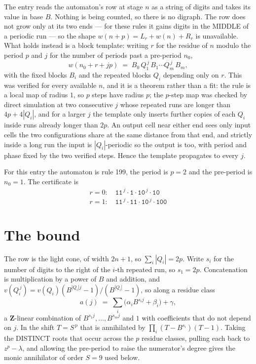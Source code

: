 \documentclass[11pt,a4paper]{article}
\theoremstyle{plain}
\theoremstyle{definition}
\begin{document}
The entry reads the automaton's row at stage $n$ as a string of digits and takes its value in
base $B$. Nothing is being counted, so there is no digraph. The row does not grow only at its
two ends --- for these rules it gains digits in the MIDDLE of a periodic run --- so the shape
$w(n+p)=L_r+w(n)+R_r$ is unavailable. What holds instead is a block template: writing $r$ for
the residue of $n$ modulo the period $p$ and $j$ for the number of periods past a pre-period
$n_0$,
\[
w(n_0 + r + jp)\;=\;B_0\,Q_1^{\,j}\,B_1\cdots Q_m^{\,j}\,B_m,
\]
with the fixed blocks $B_i$ and the repeated blocks $Q_i$ depending only on $r$. This was
verified for every available $n$, and it is a theorem rather than a fit: the rule is a local
map of radius $1$, so $p$ steps have radius $p$; the $p$-step map was checked by direct
simulation at two consecutive $j$ whose repeated runs are longer than $4p+4|Q_i|$, and for a
larger $j$ the template only inserts further copies of each $Q_i$ inside runs already longer
than $2p$. An output cell near either end sees only input cells the two configurations share
at the same distance from that end, and strictly inside a long run the input is
$|Q_i|$-periodic so the output is too, with period and phase fixed by the two verified steps.
Hence the template propagates to every $j$.

For this entry the automaton is rule 199, the period is $p=2$ and the pre-period is $n_0=1$.
The certificate is
\begin{gather*}
r=0:\quad \texttt{11}^{\,j} \cdot \texttt{1} \cdot \texttt{10}^{\,j} \cdot \texttt{10} \\
r=1:\quad \texttt{11}^{\,j} \cdot \texttt{11} \cdot \texttt{10}^{\,j} \cdot \texttt{100}
\end{gather*}

\section{The bound}

The row is the light cone, of width $2n+1$, so $\sum_i|Q_i|=2p$. Write $s_i$ for the number of
digits to the right of the $i$-th repeated run, so $s_1=2p$. Concatenation is multiplication by
a power of $B$ and addition, and $v(Q_i^{\,j})=v(Q_i)(B^{|Q_i|j}-1)/(B^{|Q_i|}-1)$, so along a
residue class
\[
a(j)\;=\;\sum_i \big(\alpha_i B^{s_i j} + \beta_i\big) + \gamma,
\]
a $\mathbf{Z}$-linear combination of $B^{s_1 j},\dots,B^{s_m j}$ and $1$ with coefficients that
do not depend on $j$. In the shift $T=S^{\,p}$ that is annihilated by
$\prod_i(T-B^{s_i})(T-1)$. Taking the DISTINCT roots that occur across the $p$ residue classes,
pulling each back to $z^p-\lambda$, and allowing the pre-period to raise the numerator's degree
gives the monic annihilator of order $S=9$ used below.
\end{document}
